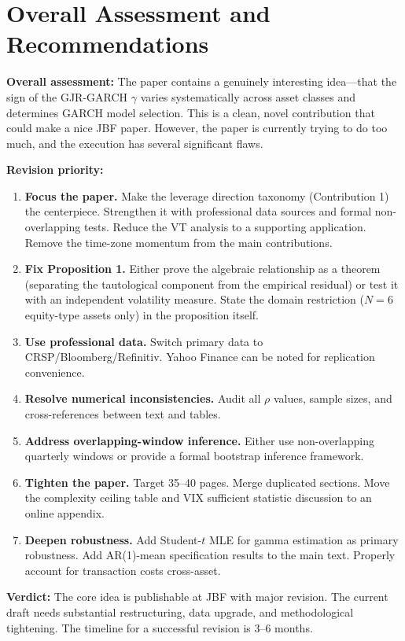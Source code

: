 \documentclass[12pt,a4paper]{article}
\begin{document}
\section*{Overall Assessment and Recommendations}

\textbf{Overall assessment:} The paper contains a genuinely interesting idea---that the sign of the GJR-GARCH $\gamma$ varies systematically across asset classes and determines GARCH model selection. This is a clean, novel contribution that could make a nice JBF paper. However, the paper is currently trying to do too much, and the execution has several significant flaws.

\textbf{Revision priority:}

\begin{enumerate}
\item \textbf{Focus the paper.} Make the leverage direction taxonomy (Contribution 1) the centerpiece. Strengthen it with professional data sources and formal non-overlapping tests. Reduce the VT analysis to a supporting application. Remove the time-zone momentum from the main contributions.

\item \textbf{Fix Proposition 1.} Either prove the algebraic relationship as a theorem (separating the tautological component from the empirical residual) or test it with an independent volatility measure. State the domain restriction ($N = 6$ equity-type assets only) in the proposition itself.

\item \textbf{Use professional data.} Switch primary data to CRSP/Bloomberg/Refinitiv. Yahoo Finance can be noted for replication convenience.

\item \textbf{Resolve numerical inconsistencies.} Audit all $\rho$ values, sample sizes, and cross-references between text and tables.

\item \textbf{Address overlapping-window inference.} Either use non-overlapping quarterly windows or provide a formal bootstrap inference framework.

\item \textbf{Tighten the paper.} Target 35--40 pages. Merge duplicated sections. Move the complexity ceiling table and VIX sufficient statistic discussion to an online appendix.

\item \textbf{Deepen robustness.} Add Student-$t$ MLE for gamma estimation as primary robustness. Add AR(1)-mean specification results to the main text. Properly account for transaction costs cross-asset.
\end{enumerate}

\vspace{1em}
\noindent\textbf{Verdict:} The core idea is publishable at JBF with major revision. The current draft needs substantial restructuring, data upgrade, and methodological tightening. The timeline for a successful revision is 3--6 months.
\end{document}
